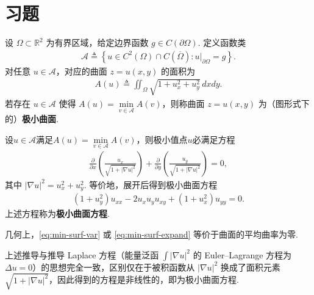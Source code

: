 \documentclass[../../main.tex]{subfiles}%
\begin{document}
\section{习题}

\begin{proposition}
设 $\Omega\subset\mathbb R^2$ 为有界区域，给定边界函数 $g\in C(\partial\Omega)$. 定义函数类
\begin{align*}
\mathcal A\triangleq\left\{u\in C^2(\Omega)\cap C(\overline{\Omega}): u|_{\partial\Omega}=g\right\}.
\end{align*}
对任意 $u\in\mathcal A$，对应的曲面 $z=u(x,y)$ 的面积为
\begin{align*}
A(u)\triangleq\iint_\Omega \sqrt{1+u_x^2+u_y^2}\,dxdy.
\end{align*}
若存在 $u\in\mathcal A$ 使得 $A(u)=\min\limits_{v\in\mathcal A}A(v)$，则称曲面 $z=u(x,y)$ 为（图形式下的）\textbf{极小曲面}.

设$u\in\mathcal A$满足$A(u)=\min\limits_{v\in\mathcal A}A(v)$，则极小值点$u$必满足方程
\begin{align}
\frac{\partial}{\partial x}\left(\frac{u_x}{\sqrt{1+|\nabla u|^2}}\right)
+\frac{\partial}{\partial y}\left(\frac{u_y}{\sqrt{1+|\nabla u|^2}}\right)=0, \label{eq:min-surf-var}
\end{align}
其中 $|\nabla u|^2=u_x^2+u_y^2$. 等价地，展开后得到极小曲面方程
\begin{align}
(1+u_y^2)u_{xx} - 2u_xu_y u_{xy} + (1+u_x^2)u_{yy}=0. \label{eq:min-surf-expand}
\end{align}
上述方程称为\textbf{极小曲面方程}.
\end{proposition}
\begin{remark}
几何上，\eqref{eq:min-surf-var} 或 \eqref{eq:min-surf-expand} 等价于曲面的平均曲率为零.
\end{remark}
\begin{remark}
上述推导与推导 Laplace 方程（能量泛函 $\int|\nabla u|^2$ 的 Euler--Lagrange 方程为 $\Delta u=0$）的思想完全一致，区别仅在于被积函数从 $|\nabla u|^2$ 换成了面积元素 $\sqrt{1+|\nabla u|^2}$，因此得到的方程是非线性的，即为极小曲面方程.
\end{remark}
\end{document}

